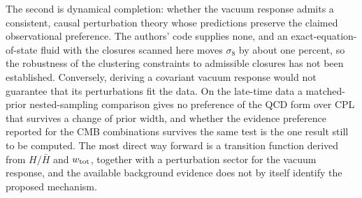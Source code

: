 \documentclass[11pt]{article}
\newcommand{\Hb}{\bar H}
\begin{document}
The second is dynamical completion: whether the vacuum response admits a consistent, causal perturbation theory whose predictions preserve the claimed observational preference. The authors' code supplies none, and an exact-equation-of-state fluid with the closures scanned here moves $\sigma_8$ by about one percent, so the robustness of the clustering constraints to admissible closures has not been established. Conversely, deriving a covariant vacuum response would not guarantee that its perturbations fit the data. On the late-time data a matched-prior nested-sampling comparison gives no preference of the QCD form over CPL that survives a change of prior width, and whether the evidence preference reported for the CMB combinations survives the same test is the one result still to be computed. The most direct way forward is a transition function derived from $H/\Hb$ and $w_{\rm tot}$, together with a perturbation sector for the vacuum response, and the available background evidence does not by itself identify the proposed mechanism.
\end{document}
